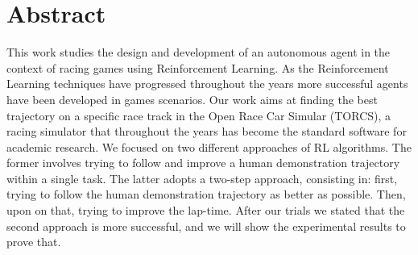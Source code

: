 \newpage
\chapter*{Abstract}


This work studies the design and development of an autonomous agent in the context of racing games using Reinforcement Learning. As the Reinforcement Learning techniques have progressed throughout the years more successful agents have been developed in games scenarios. 
Our work aims at finding the best trajectory on a specific race track in the Open Race Car Simular (TORCS), a racing simulator that throughout the years has become the standard software for academic research.
We focused on two different approaches of RL algorithms.
The former involves trying to follow and improve a human demonstration trajectory within a single task.
The latter adopts a two-step approach, consisting in: first, trying to follow the human demonstration trajectory as better as possible. Then, upon on that, trying to improve the lap-time.
After our trials we stated that the second approach is more successful, and we will show the experimental results to prove that.